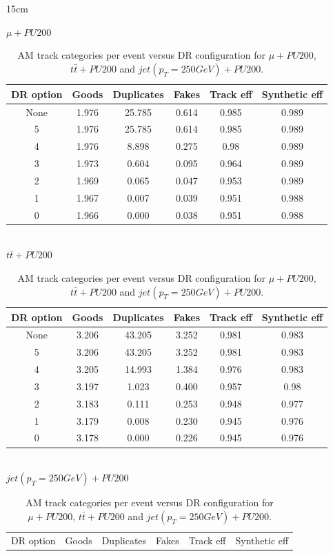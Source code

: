 \begin{table}[htbp]{15cm}
	\caption{AM track categories per event versus DR configuration for $\mu+PU200$, $t\bar{t}+PU200$ and $jet(p_{T}=250GeV) + PU200$.}
	\centering
	$\mu+PU200$\\
	\begin{tabular}{c|c|c|c|c|c}
		\hline
		\hline
		DR option & Goods & Duplicates & Fakes & Track eff & Synthetic eff\\
		\hline
		None      & 1.976 &	25.785	   & 0.614 & 0.985	   & 0.989\\
		5         & 1.976 &	25.785	   & 0.614 & 0.985	   & 0.989\\
		4         & 1.976 &	8.898	   & 0.275 & 0.98	   & 0.989\\
		3         & 1.973 &	0.604	   & 0.095 & 0.964	   & 0.989\\
		2         & 1.969 &	0.065	   & 0.047 & 0.953	   & 0.989\\
		1         & 1.967 &	0.007	   & 0.039 & 0.951	   & 0.988\\
		0         & 1.966 &	0.000	   & 0.038 & 0.951	   & 0.988\\
		\hline
	\end{tabular}\\[0.5cm]
	$t\bar{t}+PU200$\\
	\begin{tabular}{c|c|c|c|c|c}
		\hline
		\hline
		DR option & Goods & Duplicates & Fakes & Track eff & Synthetic eff\\
		\hline
		None	  & 3.206 &	43.205	   & 3.252 & 0.981	   & 0.983\\
		5	      & 3.206 &	43.205	   & 3.252 & 0.981     & 0.983\\
		4	      & 3.205 &	14.993	   & 1.384 & 0.976     & 0.983\\
		3	      & 3.197 &	1.023	   & 0.400 & 0.957     & 0.98\\
		2	      & 3.183 &	0.111	   & 0.253 & 0.948     & 0.977\\
		1	      & 3.179 &	0.008	   & 0.230 & 0.945     & 0.976\\
		0	      & 3.178 &	0.000	   & 0.226 & 0.945     & 0.976\\
		\hline
	\end{tabular}\\[0.5cm]
	$jet(p_{T}=250GeV)+PU200$\\
	\begin{tabular}{c|c|c|c|c|c}
		\hline
		\hline
		DR option & Goods & Duplicates & Fakes & Track eff & Synthetic eff\\

\end{tabular}
\end{table}
